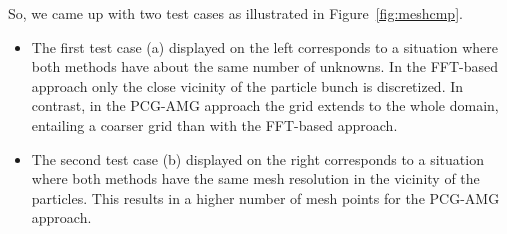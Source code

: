 \documentclass[a4paper,10pt,3p,preprint,pdftex]{elsarticle}
\begin{document}
So, we came up with two test cases as illustrated in
Figure~\ref{fig:meshcmp}.
\begin{itemize}
\item The first test case (a) displayed on the left corresponds to a
  situation where both methods have about the same number of unknowns.
  In the FFT-based approach only the close vicinity of the particle
  bunch is discretized.  In contrast, in the PCG-AMG approach the grid
  extends to the whole domain, entailing a coarser grid than with the
  FFT-based approach.

\item The second test case (b) displayed on the right corresponds to a
  situation where both methods have the same mesh resolution in the
  vicinity of the particles.  This results in a higher number of mesh
  points for the PCG-AMG approach.
\end{itemize}

\end{document}
